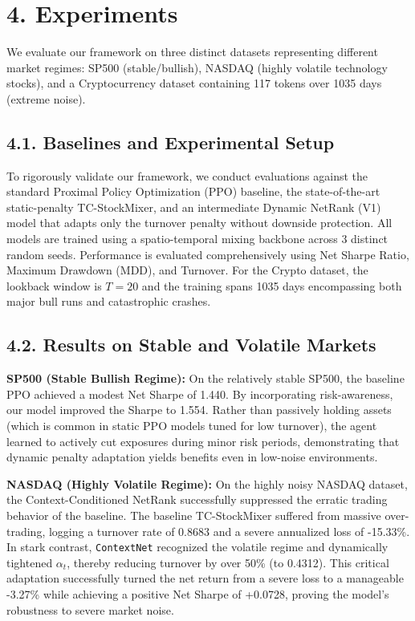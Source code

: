 \documentclass[letterpaper]{article} %
\begin{document}
\section{4. Experiments}
We evaluate our framework on three distinct datasets representing different market regimes: SP500 (stable/bullish), NASDAQ (highly volatile technology stocks), and a Cryptocurrency dataset containing 117 tokens over 1035 days (extreme noise).

\subsection{4.1. Baselines and Experimental Setup}
To rigorously validate our framework, we conduct evaluations against the standard Proximal Policy Optimization (PPO) baseline, the state-of-the-art static-penalty TC-StockMixer, and an intermediate Dynamic NetRank (V1) model that adapts only the turnover penalty without downside protection. All models are trained using a spatio-temporal mixing backbone across 3 distinct random seeds. Performance is evaluated comprehensively using Net Sharpe Ratio, Maximum Drawdown (MDD), and Turnover. For the Crypto dataset, the lookback window is $T=20$ and the training spans 1035 days encompassing both major bull runs and catastrophic crashes.

\subsection{4.2. Results on Stable and Volatile Markets}
\textbf{SP500 (Stable Bullish Regime):} On the relatively stable SP500, the baseline PPO achieved a modest Net Sharpe of 1.440. By incorporating risk-awareness, our model improved the Sharpe to 1.554. Rather than passively holding assets (which is common in static PPO models tuned for low turnover), the agent learned to actively cut exposures during minor risk periods, demonstrating that dynamic penalty adaptation yields benefits even in low-noise environments.

\textbf{NASDAQ (Highly Volatile Regime):} On the highly noisy NASDAQ dataset, the Context-Conditioned NetRank successfully suppressed the erratic trading behavior of the baseline. The baseline TC-StockMixer suffered from massive over-trading, logging a turnover rate of 0.8683 and a severe annualized loss of -15.33\%. In stark contrast, \texttt{ContextNet} recognized the volatile regime and dynamically tightened $\alpha_t$, thereby reducing turnover by over 50\% (to 0.4312). This critical adaptation successfully turned the net return from a severe loss to a manageable -3.27\% while achieving a positive Net Sharpe of +0.0728, proving the model's robustness to severe market noise.
\end{document}
